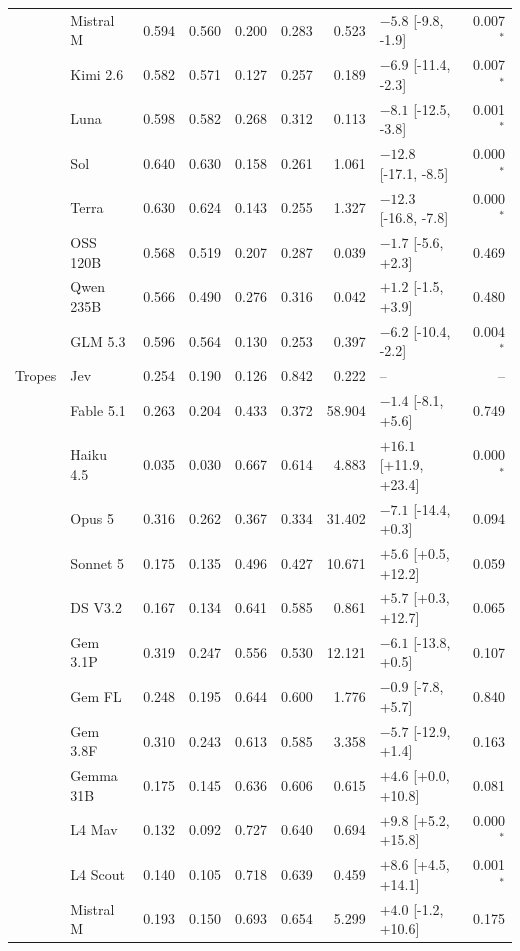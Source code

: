 \begin{longtable}{llrrrrrlr}
 & Mistral M & 0.594 & 0.560 & 0.200 & 0.283 & 0.523 & $-5.8$ [-9.8, -1.9] & 0.007$^{*}$ \\
 & Kimi 2.6 & 0.582 & 0.571 & 0.127 & 0.257 & 0.189 & $-6.9$ [-11.4, -2.3] & 0.007$^{*}$ \\
 & Luna & 0.598 & 0.582 & 0.268 & 0.312 & 0.113 & $-8.1$ [-12.5, -3.8] & 0.001$^{*}$ \\
 & Sol & 0.640 & 0.630 & 0.158 & 0.261 & 1.061 & $-12.8$ [-17.1, -8.5] & 0.000$^{*}$ \\
 & Terra & 0.630 & 0.624 & 0.143 & 0.255 & 1.327 & $-12.3$ [-16.8, -7.8] & 0.000$^{*}$ \\
 & OSS 120B & 0.568 & 0.519 & 0.207 & 0.287 & 0.039 & $-1.7$ [-5.6, +2.3] & 0.469 \\
 & Qwen 235B & 0.566 & 0.490 & 0.276 & 0.316 & 0.042 & $+1.2$ [-1.5, +3.9] & 0.480 \\
 & GLM 5.3 & 0.596 & 0.564 & 0.130 & 0.253 & 0.397 & $-6.2$ [-10.4, -2.2] & 0.004$^{*}$ \\
\midrule
Tropes & Jev & 0.254 & 0.190 & 0.126 & 0.842 & 0.222 & -- & -- \\
 & Fable 5.1 & 0.263 & 0.204 & 0.433 & 0.372 & 58.904 & $-1.4$ [-8.1, +5.6] & 0.749 \\
 & Haiku 4.5 & 0.035 & 0.030 & 0.667 & 0.614 & 4.883 & $+16.1$ [+11.9, +23.4] & 0.000$^{*}$ \\
 & Opus 5 & 0.316 & 0.262 & 0.367 & 0.334 & 31.402 & $-7.1$ [-14.4, +0.3] & 0.094 \\
 & Sonnet 5 & 0.175 & 0.135 & 0.496 & 0.427 & 10.671 & $+5.6$ [+0.5, +12.2] & 0.059 \\
 & DS V3.2 & 0.167 & 0.134 & 0.641 & 0.585 & 0.861 & $+5.7$ [+0.3, +12.7] & 0.065 \\
 & Gem 3.1P & 0.319 & 0.247 & 0.556 & 0.530 & 12.121 & $-6.1$ [-13.8, +0.5] & 0.107 \\
 & Gem FL & 0.248 & 0.195 & 0.644 & 0.600 & 1.776 & $-0.9$ [-7.8, +5.7] & 0.840 \\
 & Gem 3.8F & 0.310 & 0.243 & 0.613 & 0.585 & 3.358 & $-5.7$ [-12.9, +1.4] & 0.163 \\
 & Gemma 31B & 0.175 & 0.145 & 0.636 & 0.606 & 0.615 & $+4.6$ [+0.0, +10.8] & 0.081 \\
 & L4 Mav & 0.132 & 0.092 & 0.727 & 0.640 & 0.694 & $+9.8$ [+5.2, +15.8] & 0.000$^{*}$ \\
 & L4 Scout & 0.140 & 0.105 & 0.718 & 0.639 & 0.459 & $+8.6$ [+4.5, +14.1] & 0.001$^{*}$ \\
 & Mistral M & 0.193 & 0.150 & 0.693 & 0.654 & 5.299 & $+4.0$ [-1.2, +10.6] & 0.175 \\

\end{longtable}
